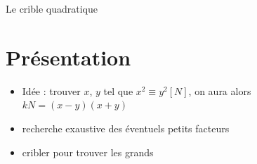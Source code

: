 \documentclass{beamer}
\begin{document}
\begin{frame}{Le crible quadratique}
  
\section{Présentation}
  
\begin{itemize}

 
 \item<1,2,3> Idée : trouver $x$, $y$ tel que $x^2 \equiv y^2 [N]$, on aura alors $kN = (x-y)(x+y)$
 
 \item<2, 3> recherche exaustive des éventuels petits facteurs

 \item<3> cribler pour trouver les grands
 
 
  \end{itemize}
  
\end{frame}
\end{document}

